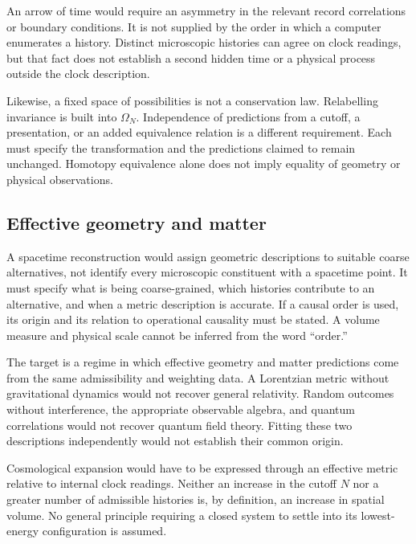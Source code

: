 An arrow of time would require an asymmetry in the relevant record
correlations or boundary conditions. It is not supplied by the order in
which a computer enumerates a history. Distinct microscopic histories can
agree on clock readings, but that fact does not establish a second hidden
time or a physical process outside the clock description.

Likewise, a fixed space of possibilities is not a conservation law.
Relabelling invariance is built into $\Omega_N$. Independence of predictions
from a cutoff, a presentation, or an added equivalence relation is a
different requirement. Each must specify the transformation and the
predictions claimed to remain unchanged. Homotopy equivalence alone does
not imply equality of geometry or physical observations.


\subsection{Effective geometry and matter}
\label{sec:geometry}

A spacetime reconstruction would assign geometric descriptions to suitable
coarse alternatives, not identify every microscopic constituent with a
spacetime point. It must specify what is being coarse-grained, which
histories contribute to an alternative, and when a metric description is
accurate. If a causal order is used, its origin and its relation to
operational causality must be stated. A volume measure and physical scale
cannot be inferred from the word ``order.''

The target is a regime in which effective geometry and matter predictions
come from the same admissibility and weighting data. A Lorentzian metric
without gravitational dynamics would not recover general relativity.
Random outcomes without interference, the appropriate observable algebra,
and quantum correlations would not recover quantum field theory. Fitting
these two descriptions independently would not establish their common
origin.

Cosmological expansion would have to be expressed through an effective
metric relative to internal clock readings. Neither an increase in the
cutoff $N$ nor a greater number of admissible histories is, by definition,
an increase in spatial volume. No general principle requiring a closed
system to settle into its lowest-energy configuration is assumed.

